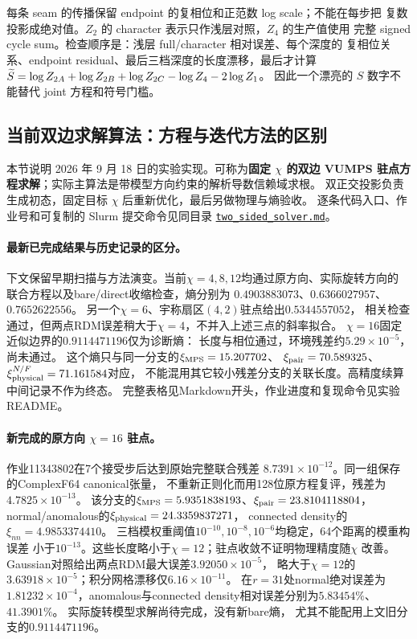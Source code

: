 每条 seam 的传播保留 endpoint 的复相位和正范数 log scale；不能在每步把
复数投影成绝对值。$Z_2$ 的 character 表示只作浅层对照，$Z_4$ 的生产值使用
完整 signed cycle sum。检查顺序是：浅层 full/character 相对误差、每个深度的
复相位关系、endpoint residual、最后三档深度的长度漂移，最后才计算
$\widetilde S=\log Z_{2A}+\log Z_{2B}+\log Z_{2C}-\log Z_4-2\log Z_1$。
因此一个漂亮的 $S$ 数字不能替代 joint 方程和符号门槛。

\subsection{当前双边求解算法：方程与迭代方法的区别}
\label{sec:current-pair-solver}

本节说明 2026 年 9 月 18 日的实验实现。可称为\textbf{固定 $\chi$ 的双边
VUMPS 驻点方程求解}；实际主算法是带模型方向约束的解析导数信赖域求根。
双正交投影负责生成初态，固定目标 $\chi$ 后重新优化，最后另做物理与熵验收。
逐条代码入口、作业号和可复制的 Slurm 提交命令见同目录
\href{two_sided_solver.md}{\texttt{two\_sided\_solver.md}}。

\paragraph{最新已完成结果与历史记录的区分。}
下文保留早期扫描与方法演变。当前$\chi=4,8,12$均通过原方向、实际旋转方向的
联合方程以及bare/direct收缩检查，熵分别为
$0.4903883073$、$0.6366027957$、$0.7652622556$。
另一个$\chi=6$、宇称扇区$(4,2)$驻点给出$0.5344557052$，
相关检查通过，但两点RDM误差稍大于$\chi=4$，不并入上述三点的斜率拟合。
$\chi=16$固定近似边界的$0.9114471196$仅为诊断熵：
长度与相位通过，环境残差约$5.29\times10^{-5}$，尚未通过。
这个熵只与同一分支的$\xi_{\rm MPS}=15.207702$、
$\xi_{\rm pair}=70.589325$、$\xi_{\rm physical}^{N/F}=71.161584$对应，
不能混用其它较小残差分支的关联长度。高精度续算中间记录不作为终态。
完整表格见Markdown开头，作业进度和复现命令见实验README。

\paragraph{新完成的原方向 $\chi=16$ 驻点。}
作业11343802在7个接受步后达到原始完整联合残差
$8.7391\times10^{-12}$。同一组保存的ComplexF64 canonical张量，
不重新正则化而用128位原方程复评，残差为$4.7825\times10^{-13}$。
该分支的$\xi_{\rm MPS}=5.9351838193$、$\xi_{\rm pair}=23.8104118804$，
normal/anomalous的$\xi_{\rm physical}=24.3359837271$，
connected density的$\xi_{nn}=4.9853374410$。
三档模权重阈值$10^{-10},10^{-8},10^{-6}$均稳定，64个距离的模重构误差
小于$10^{-13}$。这些长度略小于$\chi=12$；驻点收敛不证明物理精度随$\chi$
改善。Gaussian对照给出两点RDM最大误差$3.92050\times10^{-5}$，
略大于$\chi=12$的$3.63918\times10^{-5}$；积分网格漂移仅$6.16\times10^{-11}$。
在$r=31$处normal绝对误差为$1.81232\times10^{-4}$，anomalous与connected
density相对误差分别为$5.83454\%$、$41.3901\%$。
实际旋转模型求解尚待完成，没有新bare熵，
尤其不能配用上文旧分支的$0.9114471196$。

